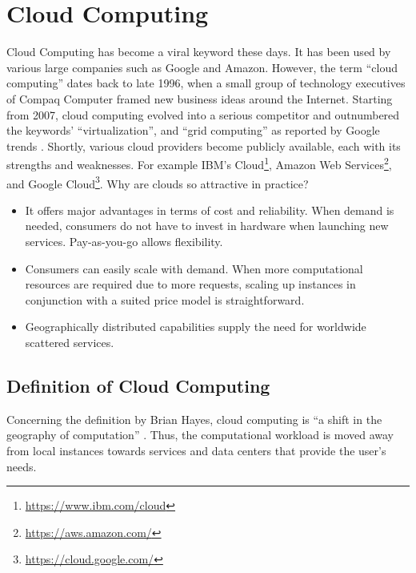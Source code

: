 \section{Cloud Computing}
\label{sec:cloud-computing}

Cloud Computing has become a viral keyword these days. 
It has been used by various large companies such as Google and Amazon.
However, the term \enquote{cloud computing} dates back to late 1996, when a small group of technology executives of Compaq Computer framed new business ideas around the Internet.\cite{regalado2020}
Starting from 2007, cloud computing evolved into a serious competitor and outnumbered the keywords' \enquote{virtualization}, and \enquote{grid computing} as reported by Google trends \cite{Wang2010}.
Shortly, various cloud providers become publicly available, each with its strengths and weaknesses.
For example IBM's Cloud\footnote{\url{https://www.ibm.com/cloud}}, Amazon Web Services\footnote{\url{https://aws.amazon.com/}}, and Google Cloud\footnote{\url{https://cloud.google.com/}}.
Why are clouds so attractive in practice?

\begin{itemize}
    \item It offers major advantages in terms of cost and reliability.
    When demand is needed, consumers do not have to invest in hardware when launching new services.
    Pay-as-you-go allows flexibility.
    \item Consumers can easily scale with demand.
    When more computational resources are required due to more requests, scaling up instances in conjunction with a suited price model is straightforward.
    \item Geographically distributed capabilities supply the need for worldwide scattered services.
\end{itemize}

\subsection{Definition of Cloud Computing}

Concerning the definition by Brian Hayes, cloud computing is \enquote{a shift in the geography of computation} \cite{hayes2008}.
Thus, the computational workload is moved away from local instances towards services and data centers that provide the user's needs\cite{Armbrust2010}.

